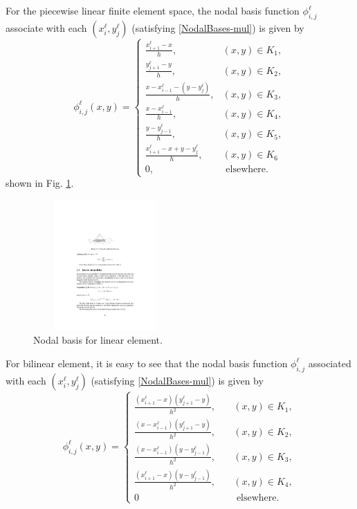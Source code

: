 For the piecewise linear finite element space, the nodal basis function $\phi^\ell_{i,j}$  associate with each $(x_i^\ell,y_j^\ell)$   
(satisfying \eqref{NodalBases-mul}) is given by 
\begin{equation}
  \label{LinearNodalBasis}
  \phi_{i,j}^\ell(x,y)=\left\{
  \begin{array}{ll}
\frac{x^\ell_{i+1}-x}{h}, & (x,y)\in K_1, \\
\frac{y^\ell_{j+1}-y}{h}, &(x,y)\in K_2,\\
\frac{x-x^\ell_{i-1}-(y-y^\ell_j)}{h}, &(x,y)\in K_3,\\
\frac{x-x^\ell_{i-1}}{h}, &(x,y)\in K_4,\\
\frac{y-y^\ell_{j-1}}{h}, &(x,y)\in K_5,\\
\frac{x^\ell_{i+1}-x+y-y^\ell_j}{h}, &(x,y)\in K_6\\
0, & \mbox{ elsewhere.} 
\end{array}
\right.
\end{equation}
shown in Fig. \ref{fig:nodallinear}.
\begin{figure}
\centering
\includegraphics[width=5.5cm,height=5cm]{figures/nodalbasis.pdf} 
\caption{\footnotesize{Nodal basis for linear element.}}
\label{fig:nodallinear}
\end{figure}

For bilinear element, it is easy to see that the nodal basis function $\phi^\ell_{i,j}$  associated with each $(x^\ell_i,y^\ell_j)$   
(satisfying \eqref{NodalBases-mul}) is given by 
\begin{equation}
  \label{BilinearNodalBasis}
  \phi^\ell_{i,j}(x,y)=\left\{
  \begin{array}{ll}
\frac{(x^\ell_{i+1}-x)(y^\ell_{j+1}-y)}{h^2}, \quad& (x,y)\in K_1, \\
\frac{(x-x^\ell_{i-1})(y^\ell_{j+1}-y)}{h^2}, \quad &(x,y)\in K_2,\\
\frac{(x-x^\ell_{i-1})(y-y^\ell_{j-1})}{h^2},\quad &(x,y)\in K_3,\\
\frac{(x^\ell_{i+1}-x)(y-y^\ell_{j-1})}{h^2},\quad &(x,y)\in K_4,\\
0 \quad & \mbox{ elsewhere.} 
\end{array}
\right.
\end{equation}


